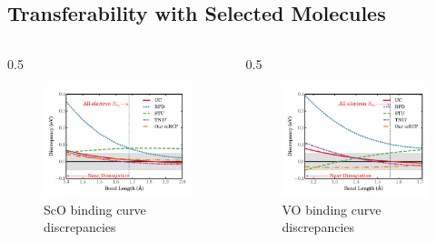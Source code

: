 \begin{frame}
\begin{columns}
\begin{column}
\begin{figure}[h]
   	     \end{figure}
	\end{column}
    \end{columns}
\end{frame}

\subsection{Transferability with Selected Molecules}

\begin{frame}
    \begin{center}
	{\Large\color{wolfred}{\bf Monoxides}}
    \end{center}
    \begin{columns}
	\begin{column}
	    {0.5\textwidth}
	    \begin{figure}[h]
		\centering
		\caption*{ScO binding curve discrepancies}
		\includegraphics[width=\textwidth]{figures/ScO}
	    \end{figure}
	\end{column}
	\begin{column}
	    {0.5\textwidth}
	    \begin{figure}[h]
		\centering
		\caption*{VO binding curve discrepancies}
		\includegraphics[width=\textwidth]{figures/VO}

\end{figure}
\end{column}
\end{columns}
\end{frame}
